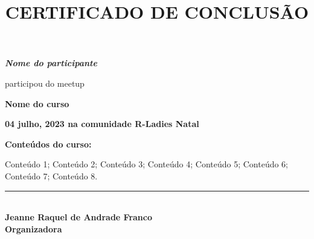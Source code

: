 \documentclass[14pt,landscape]{extarticle}
\title{CERTIFICADO DE CONCLUSÃO}
\author{}
\date{}
\providecommand{\opensans}{\normalfont}
\begin{document}
\opensans

\maketitle

\begin{center}

\Large \textbf \itshape{
Nome do participante
}

\vspace{1.3cm}

\normalsize 
participou do meetup 

\vspace{0.8cm}

\Large \textbf{
Nome do curso 
}
\normalsize

\large \textbf{
04 julho, 2023 na comunidade R-Ladies Natal
}

\vspace{0.5cm}

\Large \textbf{
Conteúdos do curso:
}

\vspace{0.5cm}

\normalsize
\begin{varwidth}{0.8\textwidth}
Conteúdo 1; Conteúdo 2; Conteúdo 3; Conteúdo 4; Conteúdo 5; Conteúdo 6; Conteúdo 7; Conteúdo 8.

\end{varwidth}

\vfill




\rule[0in]{3in}{1pt}\\
\textbf{Jeanne Raquel de Andrade Franco\\
        Organizadora}\\
\vspace{0.8cm}

\end{center}
\end{document}
